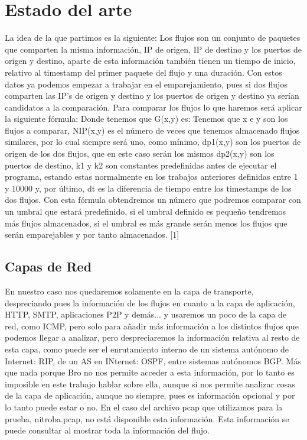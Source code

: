 \chapter{Estado del arte}

La idea de la que partimos es la siguiente: 
Los flujos son un conjunto de paquetes que comparten la misma 
información, IP de origen, IP de destino y los puertos de origen 
y destino, aparte de esta información también tienen un tiempo de 
inicio, relativo al timestamp del primer paquete del flujo y una 
duración. Con estos datos ya podemos empezar a trabajar en el 
emparejamiento, pues si dos flujos comparten las IP’s de origen y 
destino y los puertos de origen y destino ya serían candidatos a 
la comparación. Para comparar los flujos lo que haremos será 
aplicar la siguiente fórmula:
\intro
\intro
Donde tenemos que G(x,y) es:
\intro
\intro
Tenemos que x e y son los flujos a comparar, NIP(x,y) es el número 
de veces que tenemos almacenado flujos similares, por lo cual siempre 
será uno, como mínimo, dp1(x,y) son los puertos de origen de los dos 
flujos, que en este caso serán los mismos dp2(x,y) son los puertos de 
destino, k1 y k2 son constantes predefinidas antes de ejecutar el programa, 
estando estas normalmente en los trabajos anteriores definidas entre 
1 y 10000 y, por último, dt es la diferencia de tiempo entre los timestamps 
de los dos flujos.  
\intro
Con esta fórmula obtendremos un número que podremos comparar con un 
umbral que estará predefinido, si el umbral definido es pequeño 
tendremos más flujos almacenados, si el umbral es más grande serán 
menos los flujos que serán emparejables y por tanto almacenados. [1]


\section{Capas de Red}

En nuestro caso nos quedaremos solamente en la capa de transporte, 
despreciando pues la información de los flujos en cuanto a la capa 
de aplicación, HTTP, SMTP, aplicaciones P2P y demás... y usaremos 
un poco de la capa de red, como ICMP, pero solo para añadir más 
información a los distintos flujos que podemos llegar a analizar, 
pero despreciaremos la información relativa al resto de esta capa, 
como puede ser el enrutamiento interno de un sistema autónomo de 
Internet: RIP, de un AS en INternet: OSPF, entre sistemas autónomos 
BGP. Más que nada porque Bro no nos permite acceder a esta información, 
por lo tanto es imposible en este trabajo hablar sobre ella, aunque si 
nos permite analizar cosas de la capa de aplicación, aunque no siempre, 
pues es información opcional y por lo tanto puede estar o no. En el 
caso del archivo pcap que utilizamos para la prueba, nitroba.pcap, 
no está disponible esta información. Esta información se puede consultar 
al mostrar toda la información del flujo.

